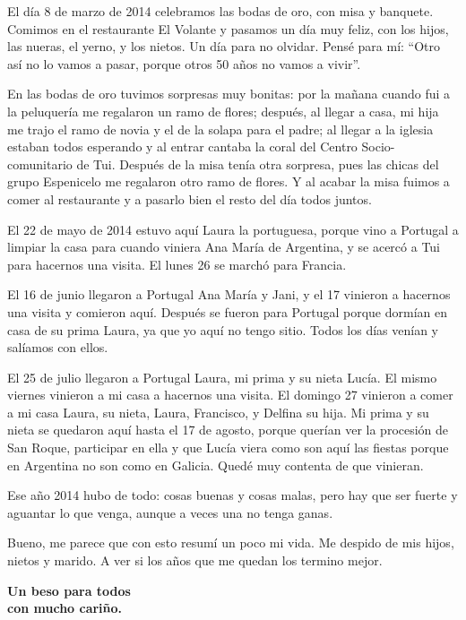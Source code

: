 \documentclass[12pt,a5paper]{book}
\begin{document}
El día 8 de marzo de 2014 celebramos las bodas de oro, con misa y banquete. Comimos en el restaurante El Volante y pasamos un día muy feliz, con los hijos, las nueras, el yerno, y los nietos. Un día para no olvidar. Pensé para mí: ``Otro así no lo vamos a pasar, porque otros 50 años no vamos a vivir''. 

En las bodas de oro tuvimos sorpresas muy bonitas: por la mañana cuando fui a la peluquería me regalaron un ramo de flores; después, al llegar a casa, mi hija me trajo el ramo de novia y el de la solapa para el padre; al llegar a la iglesia estaban todos esperando y al entrar cantaba la coral del Centro Socio-comunitario de Tui. Después de la misa tenía otra sorpresa, pues las chicas del grupo Espenicelo me regalaron otro ramo de flores. Y al acabar la misa fuimos a comer al restaurante y a pasarlo bien el resto del día todos juntos.

El 22 de mayo de 2014 estuvo aquí Laura la portuguesa, porque vino a Portugal a limpiar la casa para cuando viniera Ana María de Argentina, y se acercó a Tui para hacernos una visita. El lunes 26 se marchó para Francia.

El 16 de junio llegaron a Portugal Ana María y Jani, y el 17 vinieron a hacernos una visita y comieron aquí. Después se fueron para Portugal porque dormían en casa de su prima Laura, ya que yo aquí no tengo sitio. Todos los días venían y salíamos con ellos.

El 25 de julio llegaron a Portugal Laura, mi prima y su nieta Lucía. El mismo viernes vinieron a mi casa a hacernos una visita. El domingo 27 vinieron a comer a mi casa Laura, su nieta, Laura, Francisco, y Delfina su hija. Mi prima y su nieta se quedaron aquí hasta el 17 de agosto, porque querían ver la procesión de San Roque, participar en ella y que Lucía viera como son aquí las fiestas porque en Argentina no son como en Galicia. Quedé muy contenta de que vinieran.

Ese año 2014 hubo de todo: cosas buenas y cosas malas, pero hay que ser fuerte y aguantar lo que venga, aunque a veces una no tenga ganas.

Bueno, me parece que con esto resumí un poco mi vida. Me despido de mis hijos, nietos y marido. A ver si los años que me quedan los termino mejor.



\begin{center}
\textbf{Un beso para todos}\\
\textbf{con mucho cariño.}
\end{center}
\end{document}
